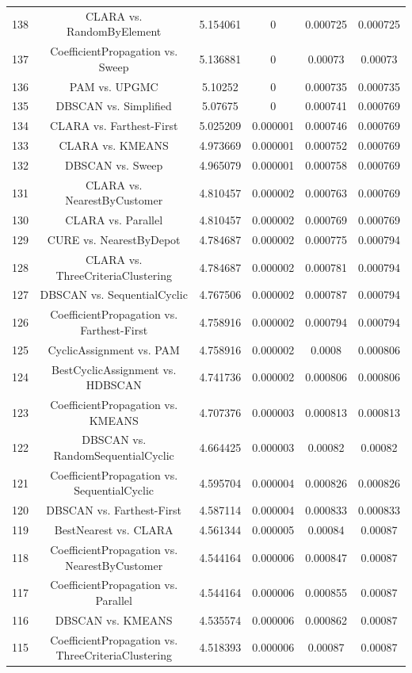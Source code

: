 \documentclass[a4paper,10pt]{article}
\begin{document}
\begin{landscape}
\begin{table}[!htp]
\begin{tabular}{cccccc}
138&CLARA vs. RandomByElement&5.154061&0&0.000725&0.000725\\
137&CoefficientPropagation vs. Sweep&5.136881&0&0.00073&0.00073\\
136&PAM vs. UPGMC&5.10252&0&0.000735&0.000735\\
135&DBSCAN vs. Simplified&5.07675&0&0.000741&0.000769\\
134&CLARA vs. Farthest-First&5.025209&0.000001&0.000746&0.000769\\
133&CLARA vs. KMEANS&4.973669&0.000001&0.000752&0.000769\\
132&DBSCAN vs. Sweep&4.965079&0.000001&0.000758&0.000769\\
131&CLARA vs. NearestByCustomer&4.810457&0.000002&0.000763&0.000769\\
130&CLARA vs. Parallel&4.810457&0.000002&0.000769&0.000769\\
129&CURE vs. NearestByDepot&4.784687&0.000002&0.000775&0.000794\\
128&CLARA vs. ThreeCriteriaClustering&4.784687&0.000002&0.000781&0.000794\\
127&DBSCAN vs. SequentialCyclic&4.767506&0.000002&0.000787&0.000794\\
126&CoefficientPropagation vs. Farthest-First&4.758916&0.000002&0.000794&0.000794\\
125&CyclicAssignment vs. PAM&4.758916&0.000002&0.0008&0.000806\\
124&BestCyclicAssignment vs. HDBSCAN&4.741736&0.000002&0.000806&0.000806\\
123&CoefficientPropagation vs. KMEANS&4.707376&0.000003&0.000813&0.000813\\
122&DBSCAN vs. RandomSequentialCyclic&4.664425&0.000003&0.00082&0.00082\\
121&CoefficientPropagation vs. SequentialCyclic&4.595704&0.000004&0.000826&0.000826\\
120&DBSCAN vs. Farthest-First&4.587114&0.000004&0.000833&0.000833\\
119&BestNearest vs. CLARA&4.561344&0.000005&0.00084&0.00087\\
118&CoefficientPropagation vs. NearestByCustomer&4.544164&0.000006&0.000847&0.00087\\
117&CoefficientPropagation vs. Parallel&4.544164&0.000006&0.000855&0.00087\\
116&DBSCAN vs. KMEANS&4.535574&0.000006&0.000862&0.00087\\
115&CoefficientPropagation vs. ThreeCriteriaClustering&4.518393&0.000006&0.00087&0.00087\\

\end{tabular}
\end{table}
\end{landscape}
\end{document}

